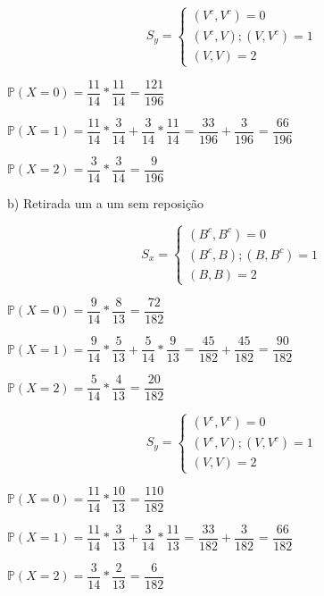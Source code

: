 \documentclass[12pt,a4paper]{article}
\begin{document}
\vspace{1cm}
\[
S_{y} =
\begin{cases}
(V^{c},V^{c}) = 0 \\
(V^{c},V);(V,V^{c}) = 1\\
(V,V) = 2
\end{cases}
\]

\begin{center}
	\vspace{0.5cm}
	$\mathbb{P}(X=0) = \dfrac{11}{14}*\dfrac{11}{14}$ = $\dfrac{121}{196}$
	
	\vspace{0.5cm}
	$\mathbb{P}(X=1) = \dfrac{11}{14}*\dfrac{3}{14} + \dfrac{3}{14}*\dfrac{11}{14}$ = $\dfrac{33}{196} + \dfrac{3}{196}$ = $\dfrac{66}{196}$
	
	\vspace{0.5cm}
	$\mathbb{P}(X=2) = \dfrac{3}{14}*\dfrac{3}{14}$ = $\dfrac{9}{196}$
\end{center}

\vspace{1cm}
b) Retirada um a um sem reposição

\[
S_{x} =
\begin{cases}
(B^{c},B^{c}) = 0 \\
(B^{c},B);(B,B^{c}) = 1\\
(B,B) = 2
\end{cases}
\]

\begin{center}
	\vspace{0.5cm}
	$\mathbb{P}(X=0) = \dfrac{9}{14}*\dfrac{8}{13}$ = $\dfrac{72}{182}$
	
	\vspace{0.5cm}
	$\mathbb{P}(X=1) = \dfrac{9}{14}*\dfrac{5}{13} + \dfrac{5}{14}*\dfrac{9}{13}$ = $\dfrac{45}{182} + \dfrac{45}{182}$ = $\dfrac{90}{182}$
	
	\vspace{0.5cm}
	$\mathbb{P}(X=2) = \dfrac{5}{14}*\dfrac{4}{13}$ = $\dfrac{20}{182}$
\end{center}

\vspace{1cm}
\[
S_{y} =
\begin{cases}
(V^{c},V^{c}) = 0 \\
(V^{c},V);(V,V^{c}) = 1\\
(V,V) = 2
\end{cases}
\]

\begin{center}
	\vspace{0.5cm}
	$\mathbb{P}(X=0) = \dfrac{11}{14}*\dfrac{10}{13}$ = $\dfrac{110}{182}$
	
	\vspace{0.5cm}
	$\mathbb{P}(X=1) = \dfrac{11}{14}*\dfrac{3}{13} + \dfrac{3}{14}*\dfrac{11}{13}$ = $\dfrac{33}{182} + \dfrac{3}{182}$ = $\dfrac{66}{182}$
	
	\vspace{0.5cm}
	$\mathbb{P}(X=2) = \dfrac{3}{14}*\dfrac{2}{13}$ = $\dfrac{6}{182}$
\end{center}
\end{document}
